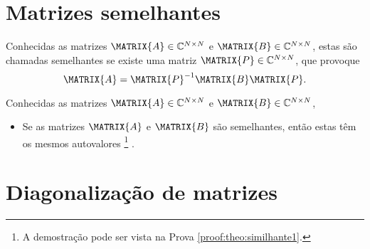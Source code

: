 \section{Matrizes semelhantes}


\begin{definition}\label{def:similhante0}
Conhecidas as matrizes  $\MATRIX{A} \in \mathbb{C}^{N \times N}$ e $\MATRIX{B} \in \mathbb{C}^{N \times N}$,
estas são chamadas semelhantes \cite[pp. 67]{golub2013matrix} se existe uma matriz $\MATRIX{P} \in \mathbb{C}^{N \times N}$, que provoque
\begin{equation}
\MATRIX{A} = \MATRIX{P}^{-1} \MATRIX{B} \MATRIX{P}.
\end{equation}
\end{definition}

\begin{theorem}\label{theo:similhante1}
Conhecidas as matrizes $\MATRIX{A} \in \mathbb{C}^{N \times N}$ e $\MATRIX{B} \in \mathbb{C}^{N \times N}$,
\begin{itemize}
\item Se as matrizes $\MATRIX{A}$ e $\MATRIX{B}$ são semelhantes, então estas têm os mesmos autovalores
\footnote{A demostração pode ser vista na Prova \ref{proof:theo:similhante1}.} \cite[pp. 67]{golub2013matrix}.
\end{itemize}
\end{theorem}

\section{Diagonalização de matrizes}

